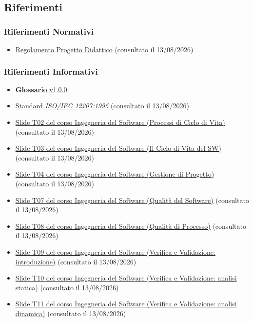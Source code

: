\documentclass[12pt, a4paper]{article}
\begin{document}
\subsection{Riferimenti}

\subsubsection{Riferimenti Normativi}

\begin{itemize}
\item
  \href{https://www.math.unipd.it/~tullio/IS-1/2025/Dispense/PD1.pdf}{Regolamento Progetto Didattico} (consultato il 13/08/2026)
\end{itemize}

\subsubsection{Riferimenti Informativi}

\begin{itemize}
\item
 \href{https://skynetunigroup.github.io/Code_Guardian/Documentazione/RTB/glossario_v1.0.0.pdf}{\textbf{Glossario} v1.0.0}
\item
  \href{https://www.math.unipd.it/~tullio/IS-1/2009/Approfondimenti/ISO_12207-1995.pdf}{Standard \textit{ISO/IEC 12207:1995}} (consultato il 13/08/2026)
\item
  \href{https://www.math.unipd.it/~tullio/IS-1/2025/Dispense/T02.pdf}{Slide T02 del corso Ingegneria del Software (Processi di Ciclo di Vita)} (consultato il 13/08/2026)
\item
  \href{https://www.math.unipd.it/~tullio/IS-1/2025/Dispense/T03.pdf}{Slide T03 del corso Ingegneria del Software (Il Ciclo di Vita del SW)} (consultato il 13/08/2026)
\item
  \href{https://www.math.unipd.it/~tullio/IS-1/2025/Dispense/T04.pdf}{Slide T04 del corso Ingegneria del Software (Gestione di Progetto)} (consultato il 13/08/2026)
\item
  \href{https://www.math.unipd.it/~tullio/IS-1/2025/Dispense/T07.pdf}{Slide T07 del corso Ingegneria del Software (Qualità del Software)} (consultato il 13/08/2026)
\item
  \href{https://www.math.unipd.it/~tullio/IS-1/2025/Dispense/T08.pdf}{Slide T08 del corso Ingegneria del Software (Qualità di Processo)} (consultato il 13/08/2026)
\item
  \href{https://www.math.unipd.it/~tullio/IS-1/2025/Dispense/T09.pdf}{Slide T09 del corso Ingegneria del Software (Verifica e Validazione: introduzione)} (consultato il 13/08/2026)
\item
  \href{https://www.math.unipd.it/~tullio/IS-1/2025/Dispense/T10.pdf}{Slide T10 del corso Ingegneria del Software (Verifica e Validazione: analisi statica)} (consultato il 13/08/2026)
\item
  \href{https://www.math.unipd.it/~tullio/IS-1/2025/Dispense/T11.pdf}{Slide T11 del corso Ingegneria del Software (Verifica e Validazione: analisi dinamica)} (consultato il 13/08/2026)
\end{itemize}
\end{document}
